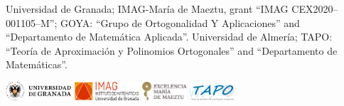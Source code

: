 \documentclass[portrait,final,a0paper,fontscale=0.38]{baposter}
\begin{document}
\begin{poster}
{{\noindent\hspace*{-5pt}
\small Universidad de Granada; IMAG-María de Maeztu, grant ``IMAG CEX2020--001105--M''; GOYA: ``Grupo de Ortogonalidad Y Aplicaciones'' and ``Departamento de Matemática Aplicada''.
\noindent Universidad de Almería; TAPO: ``Teoría de Aproximación y Polinomios Ortogonales'' and ``Departamento de Matemáticas''.}
\bigskip
\vspace{0.5pt}
\centerline{
\includegraphics[height=0.68cm]{ugrH} \quad
\includegraphics[height=0.68cm]{IMAG} \quad
\includegraphics[height=0.68cm]{maeztu} \quad
\includegraphics[height=0.68cm]{tapo.png}
}

}
\end{poster}
\end{document}

